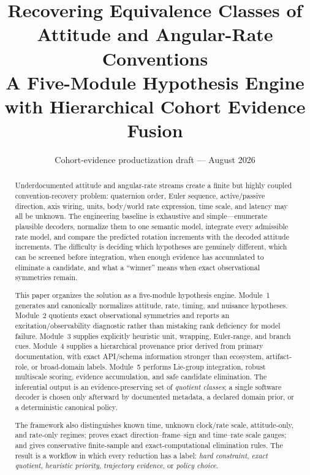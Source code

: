 \documentclass[11pt]{article}
\title{Recovering Equivalence Classes of Attitude and Angular-Rate Conventions\\
A Five-Module Hypothesis Engine with Hierarchical Cohort Evidence Fusion}
\author{}
\date{Cohort-evidence productization draft --- August 2026}
\begin{document}
    \setlength{\emergencystretch}{2em}


    \maketitle

    \begin{abstract}
        Underdocumented attitude and angular-rate streams create a finite but highly coupled
        convention-recovery problem: quaternion order, Euler sequence, active/passive direction,
        axis wiring, units, body/world rate expression, time scale, and latency may all be
        unknown. The engineering baseline is exhaustive and simple---enumerate plausible
        decoders, normalize them to one semantic model, integrate every admissible rate model,
        and compare the predicted rotation increments with the decoded attitude increments.
        The difficulty is deciding which hypotheses are genuinely different, which can be
        screened before integration, when enough evidence has accumulated to eliminate a
        candidate, and what a ``winner'' means when exact observational symmetries remain.

        This paper organizes the solution as a five-module hypothesis engine. Module~1
        generates and canonically normalizes attitude, rate, timing, and nuisance hypotheses.
        Module~2 quotients exact observational symmetries and reports an excitation/observability
        diagnostic rather than mistaking rank deficiency for model failure. Module~3 supplies
        explicitly heuristic unit, wrapping, Euler-range, and branch cues. Module~4 supplies a
        hierarchical provenance prior derived from primary documentation, with exact API/schema
        information stronger than ecosystem, artifact-role, or broad-domain labels. Module~5
        performs Lie-group integration, robust multiscale scoring, evidence accumulation, and
        safe candidate elimination. The inferential output is an evidence-preserving set of
        \emph{quotient classes}; a single software decoder is chosen only afterward by documented
        metadata, a declared domain prior, or a deterministic canonical policy.

        The framework also distinguishes known time, unknown clock/rate scale, attitude-only,
        and rate-only regimes; proves exact direction--frame--sign and time--rate scale gauges;
        and gives conservative finite-sample and exact-computational elimination rules. The
        result is a workflow in which every reduction has a label: \emph{hard constraint},
        \emph{exact quotient}, \emph{heuristic priority}, \emph{trajectory evidence}, or
        \emph{policy choice}.



\end{abstract}
\end{document}
